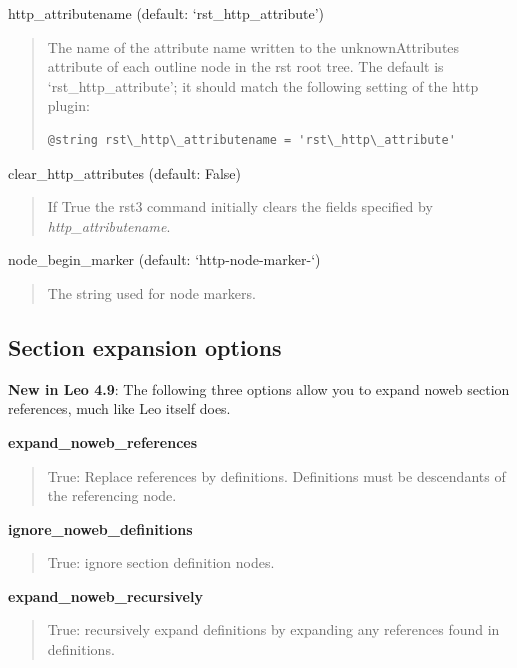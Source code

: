 \documentclass[a4paper,10pt,english]{sphinxmanual}
\begin{document}
http\_attributename (default: `rst\_http\_attribute')
\begin{quote}

The name of the attribute name written to the unknownAttributes attribute of
each outline node in the rst root tree. The default is
`rst\_http\_attribute'; it should match the following setting of the http
plugin:

\begin{Verbatim}[commandchars=\\\{\}]
@string rst\_http\_attributename = 'rst\_http\_attribute'
\end{Verbatim}
\end{quote}

clear\_http\_attributes (default: False)
\begin{quote}

If True the rst3 command initially clears the fields specified by \emph{http\_attributename}.
\end{quote}

node\_begin\_marker (default: `http-node-marker-`)
\begin{quote}

The string used for node markers.
\end{quote}


\subsection{Section expansion options}
\label{rstplugin3:section-expansion-options}
\textbf{New in Leo 4.9}: The following three options allow you
to expand noweb section references, much like Leo itself does.

\textbf{expand\_noweb\_references}
\begin{quote}

True: Replace references by definitions.
Definitions must be descendants of the referencing node.
\end{quote}

\textbf{ignore\_noweb\_definitions}
\begin{quote}

True: ignore section definition nodes.
\end{quote}

\textbf{expand\_noweb\_recursively}
\begin{quote}

True: recursively expand definitions by expanding any
references found in definitions.
\end{quote}
\end{document}
